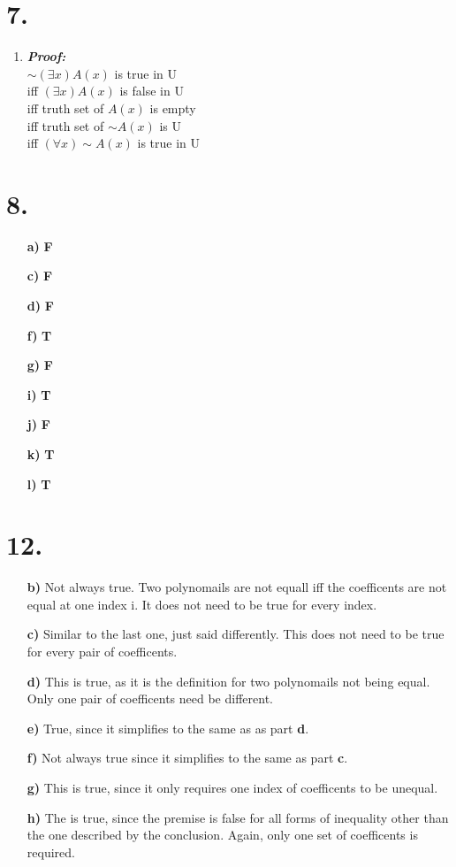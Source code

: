 \documentclass[12pt,letterpaper]{article}
\begin{document}
\section*{7.}
\begin{enumerate}[label= \textbf{\alph*)}]
	\item \textbf{\textit{Proof:}}\\
			$\sim (\exists x) A(x)$ is true in U\\
			iff $(\exists x) A(x)$ is false in U\\
			iff truth set of $A(x)$ is empty\\
			iff truth set of $\sim A(x)$ is U\\
			iff $(\forall x) \sim A(x)$ is true in U			
\end{enumerate}

\newpage 

\section*{8.}
\begin{enumerate}[label= \textbf{\alph*)}]
	\item[\textbf{a)}] \textbf{F}
	\item[\textbf{c)}] \textbf{F}
	\item[\textbf{d)}] \textbf{F}
	\item[\textbf{f)}] \textbf{T}
	\item[\textbf{g)}] \textbf{F}
	\item[\textbf{i)}] \textbf{T}
	\item[\textbf{j)}] \textbf{F}
	\item[\textbf{k)}] \textbf{T}
	\item[\textbf{l)}] \textbf{T}
\end{enumerate}

\section*{12.}
\begin{enumerate}[label= \textbf{\alph*)}]
	\item[\textbf{b)}] Not always true. Two polynomails are not equall iff 
						the coefficents are not equal at one index i. It does
						not need to be true for every index. 
	\item[\textbf{c)}] Similar to the last one, just said differently. This does not
						need to be true for every pair of coefficents. 
	\item[\textbf{d)}] This is true, as it is the definition for two polynomails
						not being equal. Only one pair of coefficents need be different. 
	\item[\textbf{e)}] True, since it simplifies to the same as as part \textbf{d}.
	\item[\textbf{f)}] Not always true since it simplifies to the same as part \textbf{c}.
	\item[\textbf{g)}] This is true, since it only requires one index of coefficents to be unequal.
	\item[\textbf{h)}] The is true, since the premise is false for all forms of inequality
						other than the one described by the conclusion. Again, only one
						set of coefficents is required.
\end{enumerate}
\end{document}
